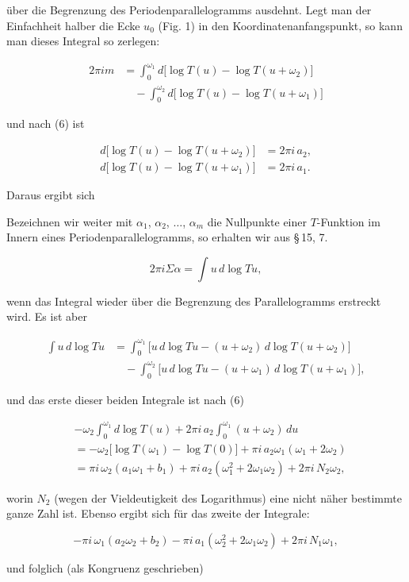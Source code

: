 über die Begrenzung des Periodenparallelogramms ausdehnt. Legt man der Einfachheit halber die Ecke $u_0$ (Fig. 1) in den Koordinatenanfangspunkt, so kann man dieses Integral so zerlegen:

\[
\begin{aligned}
2\pi i m &= \int_0^{\omega_1} d\bigl[\log T(u) - \log T(u+\omega_2)\bigr]\\
&\quad - \int_0^{\omega_2} d\bigl[\log T(u) - \log T(u+\omega_1)\bigr]
\end{aligned}
\]

und nach (6) ist

\[
\begin{aligned}
d\bigl[\log T(u) - \log T(u+\omega_2)\bigr] &= 2\pi i\,a_2,\\
d\bigl[\log T(u) - \log T(u+\omega_1)\bigr] &= 2\pi i\,a_1.
\end{aligned}
\]

Daraus ergibt sich


Bezeichnen wir weiter mit $\alpha_1$, $\alpha_2$, $\ldots$, $\alpha_m$ die Nullpunkte einer $T$-Funktion im Innern eines Periodenparallelogramms, so erhalten wir aus \S\,15, 7.

\[
2\pi i \Sigma\alpha = \int u\,d\log Tu,
\]

wenn das Integral wieder über die Begrenzung des Parallelogramms erstreckt wird. Es ist aber

\[
\begin{aligned}
\int u\,d\log Tu &= \int_0^{\omega_1} \bigl[u\,d\log Tu - (u+\omega_2)\,d\log T(u+\omega_2)\bigr]\\
&\quad - \int_0^{\omega_2} \bigl[u\,d\log Tu - (u+\omega_1)\,d\log T(u+\omega_1)\bigr],
\end{aligned}
\]

und das erste dieser beiden Integrale ist nach (6)

\[
\begin{aligned}
&-\omega_2\int_0^{\omega_1} d\log T(u) + 2\pi i\,a_2\int_0^{\omega_1} (u+\omega_2)\,du\\
&= -\omega_2\bigl[\log T(\omega_1) - \log T(0)\bigr] + \pi i\,a_2\omega_1(\omega_1+2\omega_2)\\
&= \pi i\,\omega_2(a_1\omega_1+b_1) + \pi i\,a_2(\omega_1^2+2\omega_1\omega_2) + 2\pi i\,N_2\omega_2,
\end{aligned}
\]

worin $N_2$ (wegen der Vieldeutigkeit des Logarithmus) eine nicht näher bestimmte ganze Zahl ist. Ebenso ergibt sich für das zweite der Integrale:

\[
-\pi i\,\omega_1(a_2\omega_2+b_2) - \pi i\,a_1(\omega_2^2+2\omega_1\omega_2) + 2\pi i\,N_1\omega_1,
\]

und folglich (als Kongruenz geschrieben)

